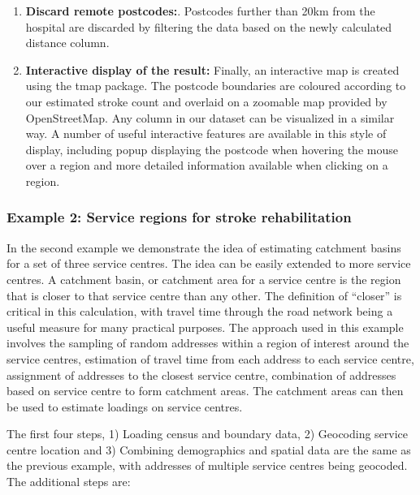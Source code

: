 \documentclass[utf8]{frontiersHLTH}
\begin{document}
\begin{enumerate}
\item
  {\bf Discard remote postcodes:}. Postcodes further than 20km from the
  hospital are discarded by filtering the data based on the newly
  calculated distance column.
\item
  {\bf Interactive display of the result:} Finally, an interactive map is
  created using the tmap package. The postcode boundaries are coloured
  according to our estimated stroke count and overlaid on a zoomable map
  provided by OpenStreetMap. Any column in our dataset can be visualized
  in a similar way. A number of useful interactive features are
  available in this style of display, including popup displaying the
  postcode when hovering the mouse over a region and more detailed
  information available when clicking on a region.
\end{enumerate}

\subsubsection{Example 2: Service regions for stroke
rehabilitation}\label{example-2-service-regions-for-stroke-rehabilitation}

In the second example we demonstrate the idea of estimating catchment
basins for a set of three service centres. The idea can be easily
extended to more service centres. A catchment basin, or catchment area
for a service centre is the region that is closer to that service centre
than any other. The definition of ``closer'' is critical in this
calculation, with travel time through the road network being a useful
measure for many practical purposes. The approach used in this example
involves the sampling of random addresses within a region of interest
around the service centres, estimation of travel time from each address
to each service centre, assignment of addresses to the closest service
centre, combination of addresses based on service centre to form
catchment areas. The catchment areas can then be used to estimate
loadings on service centres.

The first four steps, 1) Loading census and boundary data, 2) Geocoding
service centre location and 3) Combining demographics and spatial data
are the same as the previous example, with addresses of multiple service
centres being geocoded. The additional steps are:
\end{document}
